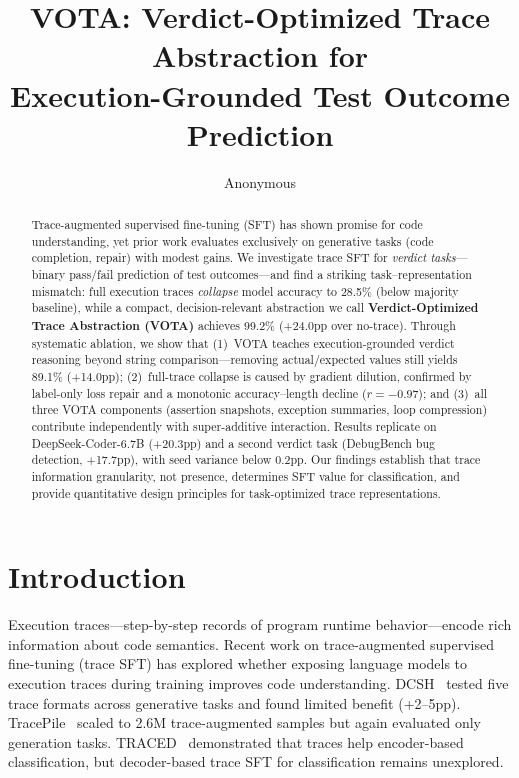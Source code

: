 \documentclass[11pt,a4paper]{article}
\title{VOTA: Verdict-Optimized Trace Abstraction for\\Execution-Grounded Test Outcome Prediction}
\author{Anonymous}
\begin{document}
\maketitle

\begin{abstract}
Trace-augmented supervised fine-tuning (SFT) has shown promise for code understanding, yet prior work evaluates exclusively on generative tasks (code completion, repair) with modest gains. We investigate trace SFT for \emph{verdict tasks}---binary pass/fail prediction of test outcomes---and find a striking task--representation mismatch: full execution traces \emph{collapse} model accuracy to 28.5\% (below majority baseline), while a compact, decision-relevant abstraction we call \textbf{Verdict-Optimized Trace Abstraction (VOTA)} achieves 99.2\% (+24.0pp over no-trace). Through systematic ablation, we show that (1)~VOTA teaches execution-grounded verdict reasoning beyond string comparison---removing actual/expected values still yields 89.1\% (+14.0pp); (2)~full-trace collapse is caused by gradient dilution, confirmed by label-only loss repair and a monotonic accuracy--length decline ($r{=}{-}0.97$); and (3)~all three VOTA components (assertion snapshots, exception summaries, loop compression) contribute independently with super-additive interaction. Results replicate on DeepSeek-Coder-6.7B (+20.3pp) and a second verdict task (DebugBench bug detection, +17.7pp), with seed variance below 0.2pp. Our findings establish that trace information granularity, not presence, determines SFT value for classification, and provide quantitative design principles for task-optimized trace representations.
\end{abstract}

\section{Introduction}

Execution traces---step-by-step records of program runtime behavior---encode rich information about code semantics. Recent work on trace-augmented supervised fine-tuning (trace SFT) has explored whether exposing language models to execution traces during training improves code understanding. DCSH~\cite{dcsh2025} tested five trace formats across generative tasks and found limited benefit (+2--5pp). TracePile~\cite{tracepile2025} scaled to 2.6M trace-augmented samples but again evaluated only generation tasks. TRACED~\cite{traced2024} demonstrated that traces help encoder-based classification, but decoder-based trace SFT for classification remains unexplored.
\end{document}
